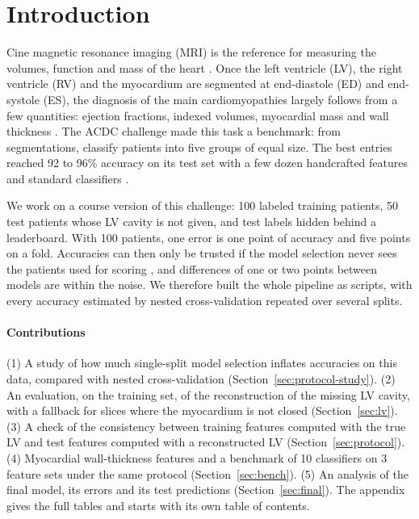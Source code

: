 \section{Introduction}
Cine magnetic resonance imaging (MRI) is the reference for measuring the volumes, function and mass of the heart \citep{schulzmenger2013}. Once the left ventricle (LV), the right ventricle (RV) and the myocardium are segmented at end-diastole (ED) and end-systole (ES), the diagnosis of the main cardiomyopathies largely follows from a few quantities: ejection fractions, indexed volumes, myocardial mass and wall thickness \citep{pinto2016,elliott2014,marcus2010}. The ACDC challenge \citep{bernard2018} made this task a benchmark: from segmentations, classify patients into five groups of equal size. The best entries reached 92 to 96\% accuracy on its test set with a few dozen handcrafted features and standard classifiers \citep{isensee2017,khened2017,wolterink2017,cetin2017}.

We work on a course version of this challenge: 100 labeled training patients, 50 test patients whose LV cavity is not given, and test labels hidden behind a leaderboard. With 100 patients, one error is one point of accuracy and five points on a fold. Accuracies can then only be trusted if the model selection never sees the patients used for scoring \citep{varma2006,cawley2010}, and differences of one or two points between models are within the noise. We therefore built the whole pipeline as scripts, with every accuracy estimated by nested cross-validation repeated over several splits.

\paragraph{Contributions}
(1) A study of how much single-split model selection inflates accuracies on this data, compared with nested cross-validation (Section~\ref{sec:protocol-study}).
(2) An evaluation, on the training set, of the reconstruction of the missing LV cavity, with a fallback for slices where the myocardium is not closed (Section~\ref{sec:lv}).
(3) A check of the consistency between training features computed with the true LV and test features computed with a reconstructed LV (Section~\ref{sec:protocol}).
(4) Myocardial wall-thickness features and a benchmark of 10 classifiers on 3 feature sets under the same protocol (Section~\ref{sec:bench}).
(5) An analysis of the final model, its errors and its test predictions (Section~\ref{sec:final}).
The appendix gives the full tables and starts with its own table of contents.
